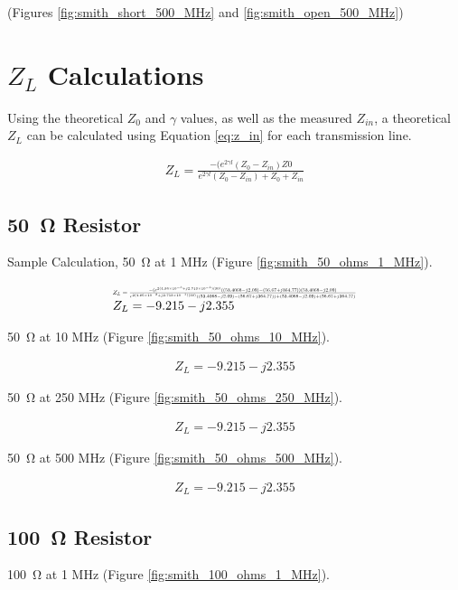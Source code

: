 \documentclass[conference]{IEEEtran}
\newcommand*{\Scale}[2][4]{\scalebox{#1}{$#2$}}%
\begin{document}
(Figures \ref{fig:smith_short_500_MHz} and \ref{fig:smith_open_500_MHz})

\section{$Z_L$ Calculations}
Using the theoretical $Z_0$ and $\gamma$ values, as well as the measured
$Z_{in}$, a theoretical $Z_L$ can be
calculated using Equation \ref{eq:z_in} for each transmission line.

\[
  \begin{array}{ll}
    Z_L = \frac{-(e^{2\gamma l} (Z_0-Z_{in})Z0}{e^{2\gamma l}
      (Z_0-Z_{in})+Z_0+Z_{in}}
  \end{array}
\]

\subsection{\SI{50}{\ohm} Resistor}
Sample Calculation, \SI{50}{\ohm} at 1 MHz (Figure
\ref{fig:smith_50_ohms_1_MHz}).

\[
  \begin{array}{ll}
  \Scale[0.5]{
    Z_L = \frac{-(e^{2(\num{4.86e-3} + j \num{2.713e-1})(30)} ((53.4068 -
      j2.09)-(56.67 + j364.77)) (53.4068 -
      j2.09)}{e^{2(\num{4.86e-3} + j \num{2.713e-1})(30)}
      ((53.4068 -
      j2.09)-(56.67 + j364.77))+(53.4068 -
      j2.09)+(56.67 + j364.77)}
  }\\
  Z_L = -9.215 -j2.355
  \end{array}
  \]

  \SI{50}{\ohm} at 10 MHz (Figure \ref{fig:smith_50_ohms_10_MHz}).

  \[
    \begin{array}{ll}
      Z_L = -9.215 - j2.355
    \end{array}
  \]

  \SI{50}{\ohm} at 250 MHz (Figure \ref{fig:smith_50_ohms_250_MHz}).

  \[
    \begin{array}{ll}
      Z_L = -9.215 - j2.355
    \end{array}
  \]

  \SI{50}{\ohm} at 500 MHz (Figure \ref{fig:smith_50_ohms_500_MHz}).

  \[
    \begin{array}{ll}
      Z_L = -9.215 - j2.355
    \end{array}
  \]

\subsection{\SI{100}{\ohm} Resistor}
\SI{100}{\ohm} at 1 MHz (Figure
\ref{fig:smith_100_ohms_1_MHz}).
\end{document}
